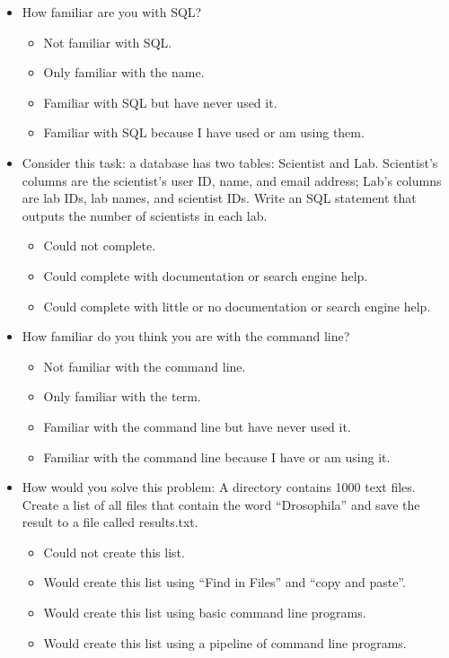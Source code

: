 \documentclass[10pt,a4paper,twocolumn]{article}
\begin{document}
\begin{itemize}
  \item
    How familiar are you with SQL?
    \begin{itemize}[noitemsep]
    \item Not familiar with SQL.
    \item Only familiar with the name.
    \item Familiar with SQL but have never used it.
    \item Familiar with SQL because I have used or am using them.
    \end{itemize}

  \item
    Consider this task: a database has two tables: Scientist and
    Lab. Scientist's columns are the scientist's user ID, name, and
    email address; Lab's columns are lab IDs, lab names, and scientist
    IDs. Write an SQL statement that outputs the number of scientists
    in each lab.
    \begin{itemize}[noitemsep]
    \item Could not complete.
    \item Could complete with documentation or search engine help.
    \item Could complete with little or no documentation or search engine help.
    \end{itemize}

  \item
    How familiar do you think you are with the command line?
    \begin{itemize}[noitemsep]
    \item Not familiar with the command line.
    \item Only familiar with the term.
    \item Familiar with the command line but have never used it.
    \item Familiar with the command line because I have or am using it.
    \end{itemize}

  \item
    How would you solve this problem: A directory contains 1000 text
    files. Create a list of all files that contain the word
    ``Drosophila'' and save the result to a file called results.txt.
    \begin{itemize}[noitemsep]
    \item Could not create this list.
    \item Would create this list using ``Find in Files'' and ``copy and paste''.
    \item Would create this list using basic command line programs.
    \item Would create this list using a pipeline of command line programs.
    \end{itemize}

  \end{itemize}
\end{document}

